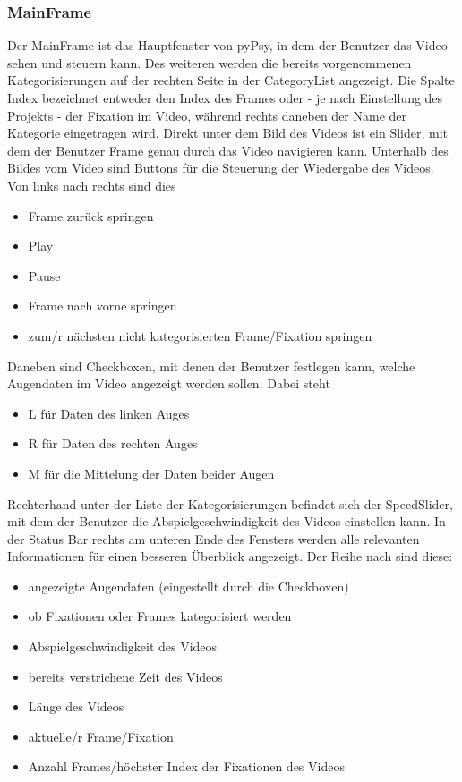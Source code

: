 \documentclass[a4paper,draft]{scrartcl}
\begin{document}
\subsubsection{MainFrame}
Der MainFrame ist das Hauptfenster von pyPsy, in dem der Benutzer das Video sehen und steuern kann. Des weiteren werden die bereits vorgenommenen Kategorisierungen auf der rechten Seite in der CategoryList angezeigt. Die Spalte Index bezeichnet entweder den Index des Frames oder - je nach Einstellung des Projekts - der Fixation im Video, während rechts daneben der Name der Kategorie eingetragen wird. 
Direkt unter dem Bild des Videos ist ein Slider, mit dem der Benutzer Frame genau durch das Video navigieren kann.
Unterhalb des Bildes vom Video sind Buttons für die Steuerung der Wiedergabe des Videos. Von links nach rechts sind dies
\begin{itemize}
\item Frame zurück springen
\item Play
\item Pause
\item Frame nach vorne springen
\item zum/r nächsten nicht kategorisierten Frame/Fixation springen
\end{itemize}
Daneben sind Checkboxen, mit denen der Benutzer festlegen kann, welche Augendaten im Video angezeigt werden sollen. Dabei steht
\begin{itemize}
\item L für Daten des linken Auges
\item R für Daten des rechten Auges
\item M für die Mittelung der Daten beider Augen
\end{itemize}
Rechterhand unter der Liste der Kategorisierungen befindet sich der SpeedSlider, mit dem der Benutzer die Abspielgeschwindigkeit des Videos einstellen kann. 
In der Status Bar rechts am unteren Ende des Fensters werden alle relevanten Informationen für einen besseren Überblick angezeigt. Der Reihe nach sind diese:
\begin{itemize}
\item angezeigte Augendaten (eingestellt durch die Checkboxen)
\item ob Fixationen oder Frames kategorisiert werden
\item Abspielgeschwindigkeit des Videos
\item bereits verstrichene Zeit des Videos
\item Länge des Videos
\item aktuelle/r Frame/Fixation 
\item Anzahl Frames/höchster Index der Fixationen des Videos
\end{itemize}
\end{document}
